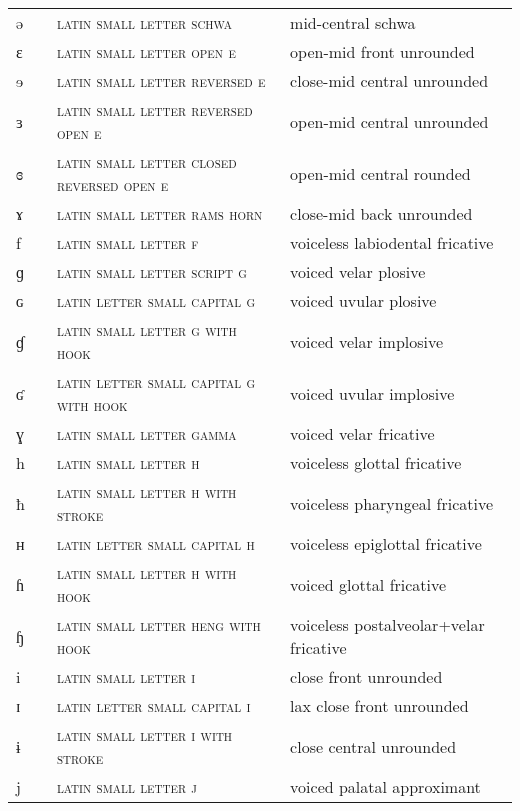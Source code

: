\begin{center}
\begin{xtabular}{ l l L{4.5cm} L{4.5cm} }
ə &  & \textsc{latin small letter schwa} & mid-central schwa \\ 
ɛ &  & \textsc{latin small letter open e} & open-mid front unrounded \\ 
ɘ &  & \textsc{latin small letter reversed e} & close-mid central unrounded \\ 
ɜ &  & \textsc{latin small letter reversed open e} & open-mid central unrounded \\ 
ɞ &  & \textsc{latin small letter closed reversed open e} & open-mid central rounded \\ 
ɤ &  & \textsc{latin small letter rams horn} & close-mid back unrounded \\ 
f &  & \textsc{latin small letter f} & voiceless labiodental fricative \\ 
ɡ &  & \textsc{latin small letter script g} & voiced velar plosive \\ 
ɢ &  & \textsc{latin letter small capital g} & voiced uvular plosive \\ 
ɠ &  & \textsc{latin small letter g with hook} & voiced velar implosive \\ 
ʛ &  & \textsc{latin letter small capital g with hook} & voiced uvular implosive \\ 
ɣ &  & \textsc{latin small letter gamma} & voiced velar fricative \\ 
h &  & \textsc{latin small letter h} & voiceless glottal fricative \\ 
ħ &  & \textsc{latin small letter h with stroke} & voiceless pharyngeal fricative \\ 
ʜ &  & \textsc{latin letter small capital h} & voiceless epiglottal fricative \\ 
ɦ &  & \textsc{latin small letter h with hook} & voiced glottal fricative \\ 
ɧ &  & \textsc{latin small letter heng with hook} & voiceless postalveolar+velar fricative \\ 
i &  & \textsc{latin small letter i} & close front unrounded \\ 
ɪ &  & \textsc{latin letter small capital i} & lax close front unrounded \\ 
ɨ &  & \textsc{latin small letter i with stroke} & close central unrounded \\ 
j &  & \textsc{latin small letter j} & voiced palatal approximant \\ 

\end{xtabular}
\end{center}

